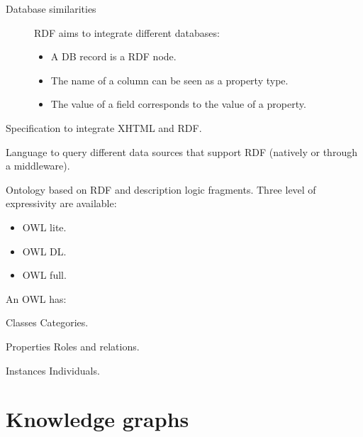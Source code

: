 \begin{description}
\begin{description}
            \item[Database similarities]
                RDF aims to integrate different databases:
                \begin{itemize}
                    \item A DB record is a RDF node.
                    \item The name of a column can be seen as a property type.
                    \item The value of a field corresponds to the value of a property.
                \end{itemize}
        \end{description}

    \item[RDFa] 
        Specification to integrate XHTML and RDF.

    \item[SPARQL] 
        Language to query different data sources that support RDF (natively or through a middleware).

    \item[Ontology web language (OWL)] 
        Ontology based on RDF and description logic fragments.
        Three level of expressivity are available:
        \begin{itemize}
            \item OWL lite.
            \item OWL DL.
            \item OWL full.
        \end{itemize}

        An OWL has:
        \begin{descriptionlist}
            \item[Classes] Categories.
            \item[Properties] Roles and relations.
            \item[Instances] Individuals.
        \end{descriptionlist}
\end{description}



\section{Knowledge graphs}

